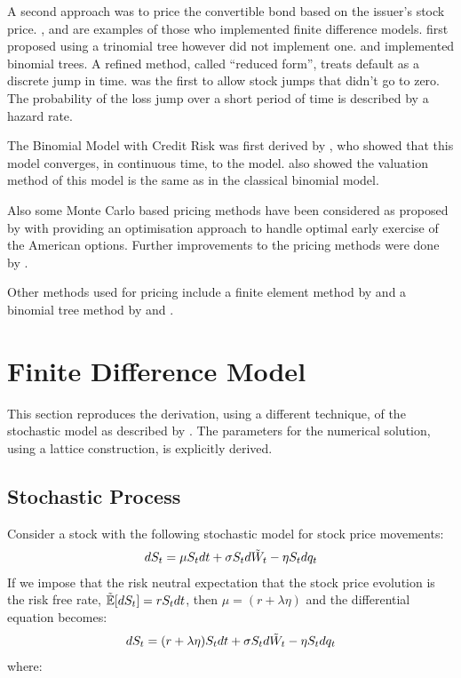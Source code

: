 \documentclass[a4paper,11pt,oneside]{report}
\theoremstyle{plain}
\theoremstyle{definition}
\begin{document}
A second approach was to price the convertible bond based on the issuer's stock price.  , \citet{TF98} and  \citet{MS86} are examples of those who implemented finite difference models.   first proposed using a trinomial tree  however did not implement one.   and \citet{H11} implemented binomial trees.  A refined method, called ``reduced form'', treats default as a discrete jump in time.   was the first to allow stock jumps that didn't go to zero.  The probability of the loss jump over a short period of time is described by a hazard rate.

The Binomial Model with Credit Risk was first derived by \citet{MK12}, who showed that this model converges, in continuous time, to the \citet{AFV03} model.   also showed the valuation method of this model is the same as in the classical binomial model.

Also some Monte Carlo based pricing methods have been considered as proposed by \citet{B89} with \citet{G03} providing an optimisation approach to handle optimal early exercise of the American options.  Further improvements to the pricing methods were done by \citet{AKW08}.

Other methods used for pricing include a finite element method by \citet{BBH03} and a binomial tree method by \citet{TKN01} and \citet{AFV02}.


\chapter{Finite Difference Model}
This section reproduces the derivation, using a different technique, of the stochastic model as described by \citet{AFV03}.  The parameters for the numerical solution, using a lattice construction, is explicitly derived.


\section{Stochastic Process}
Consider a stock with the following stochastic model for stock price movements:
\begin{equation}
 dS_t = \mu S_tdt + \sigma S_td\tilde{W}_t - \eta S_tdq_t
\end{equation}
If we impose that the risk neutral expectation that the stock price evolution is the risk free rate, $\E[\dS] = r\S\dt$, then $\mu = (r + \lambda\eta)$ and the differential equation becomes:
\begin{equation}
 dS_t = (r + \lambda\eta)S_tdt + \sigma S_td\tilde{W}_t - \eta S_tdq_t
\end{equation}
where:
\end{document}
